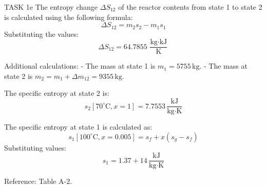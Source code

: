 TASK 1e  
The entropy change \( \Delta S_{12} \) of the reactor contents from state 1 to state 2 is calculated using the following formula:  
\[
\Delta S_{12} = m_2 s_2 - m_1 s_1
\]  
Substituting the values:  
\[
\Delta S_{12} = 64.7855 \, \frac{\text{kg} \cdot \text{kJ}}{\text{K}}
\]  

Additional calculations:  
- The mass at state 1 is \( m_1 = 5755 \, \text{kg} \).  
- The mass at state 2 is \( m_2 = m_1 + \Delta m_{12} = 9355 \, \text{kg} \).  

The specific entropy at state 2 is:  
\[
s_2 [70^\circ\text{C}, x = 1] = 7.7553 \, \frac{\text{kJ}}{\text{kg} \cdot \text{K}}
\]  

The specific entropy at state 1 is calculated as:  
\[
s_1 [100^\circ\text{C}, x = 0.005] = s_f + x (s_g - s_f)
\]  
Substituting values:  
\[
s_1 = 1.37 + 14 \, \frac{\text{kJ}}{\text{kg} \cdot \text{K}}
\]  

Reference: Table A-2.